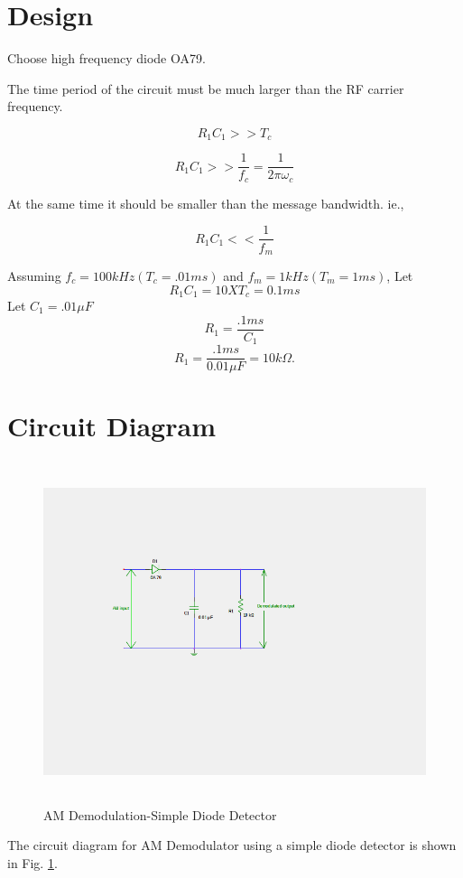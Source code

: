 \documentclass{book}
\begin{document}
\section*{Design}
Choose high frequency diode OA79.

\noindent The time period of the circuit must be much larger than the RF carrier frequency.

\begin{equation}
R_1C_1 >> T_c
\end{equation}

\begin{equation}
R_1C_1 >> \frac{1}{f_c} = \frac{1}{2\pi\omega_c}
\end{equation}

\noindent At the same time it should be smaller than the message bandwidth. ie.,

\begin{equation}
R_1C_1<< \frac{1}{f_m}
\end{equation}

\noindent Assuming $f_c=100 kHz(T_c=.01ms)$ and $f_m=1kHz(T_m=1 ms)$,
Let 
\begin{equation}
R_1C_1 = 10 X T_c =0.1 ms
\end{equation}
\noindent Let $C_1=.01\mu F$
\begin{equation}
R_1 = \frac{.1ms}{C_1} 
\end{equation}
\begin{equation}
R_1 = \frac{.1ms}{0.01\mu F}=10 k\Omega. 
\end{equation}
\section*{Circuit Diagram}

\begin{figure}[h]
\includegraphics[width=15cm, height=10cm, trim=5cm 7.5cm 7.5cm 4cm, clip=true]{AMDemod.png}
\caption{AM Demodulation-Simple Diode Detector}
\label{AMDemod} 
\end{figure}
The circuit diagram for AM Demodulator using a simple diode detector is shown in Fig. \ref{AMDemod}.
\end{document}
